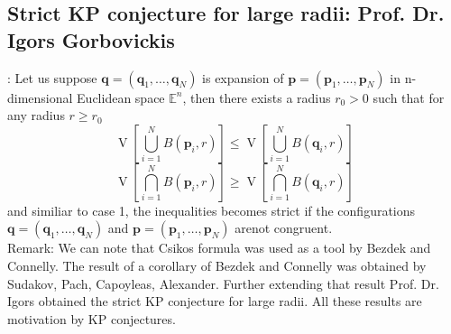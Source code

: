 \subsection{Strict KP conjecture for large radii: Prof. Dr. Igors Gorbovickis}
: Let us suppose $\mathbf{q}=\left(\mathbf{q}_{1}, \ldots, \mathbf{q}_{N}\right)$ is  expansion of $\mathbf{p}=\left(\mathbf{p}_{1}, \ldots, \mathbf{p}_{N}\right)$ in n-dimensional Euclidean space $\mathbb{E}^{n}$, then there exists a radius $r_{0}>0$ such that for any radius $r \geq r_{0}$
$$
\operatorname{V}\left[\bigcup_{i=1}^{N} B\left(\mathbf{p}_{i}, r\right)\right] \leq \operatorname{V}\left[\bigcup_{i=1}^{N} B\left(\mathbf{q}_{i}, r\right)\right]
$$
$$
\operatorname{V}\left[\bigcap_{i=1}^{N} B\left(\mathbf{p}_{i}, r\right)\right] \geq \operatorname{V}\left[\bigcap_{i=1}^{N} B\left(\mathbf{q}_{i}, r\right)\right]
$$
and similiar to case 1, the inequalities becomes strict if the configurations $\mathbf{q}=\left(\mathbf{q}_{1}, \ldots, \mathbf{q}_{N}\right)$ and $\mathbf{p}=\left(\mathbf{p}_{1}, \ldots, \mathbf{p}_{N}\right)$ arenot congruent.\\
Remark: We can note that Csikos formula was used as a tool by Bezdek and Connelly. The result of a corollary of Bezdek and Connelly was obtained by Sudakov, Pach, Capoyleas, Alexander. Further extending that result Prof. Dr. Igors obtained the strict KP conjecture for large radii. All these results are motivation by KP conjectures.
















































